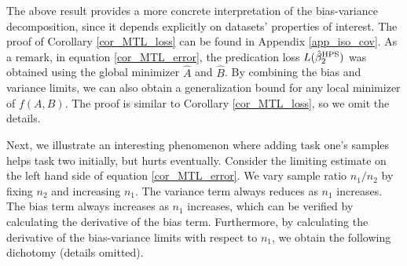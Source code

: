 

The above result provides a more concrete interpretation of the bias-variance decomposition, since it depends explicitly on datasets' properties of interest.
The proof of Corollary \ref{cor_MTL_loss} can be found in Appendix \ref{app_iso_cov}.
As a remark, in equation \eqref{cor_MTL_error}, the predication loss $L(\hat{\beta}_2^{\textup{HPS}}) $ was obtained using the global minimizer $\hat A$ and $\hat B$. By combining the bias and variance limits, we can also obtain a generalization bound for any local minimizer of $f(A, B)$.
The proof is similar to Corollary \ref{cor_MTL_loss}, so we omit the details.

Next, we illustrate an interesting phenomenon where adding task one's samples helps task two initially, but hurts eventually.
Consider the limiting estimate on the left hand side of equation \eqref{cor_MTL_error}.
We vary sample ratio $n_1 / n_2$ by fixing $n_2$ and increasing $n_1$.
The variance term always reduces as $n_1$ increases.
The bias term always increases as $n_1$ increases, which can be verified by calculating the derivative of the bias term.
Furthermore, by calculating the derivative of the bias-variance limits with respect to $n_1$, we obtain the following dichotomy (details omitted).

